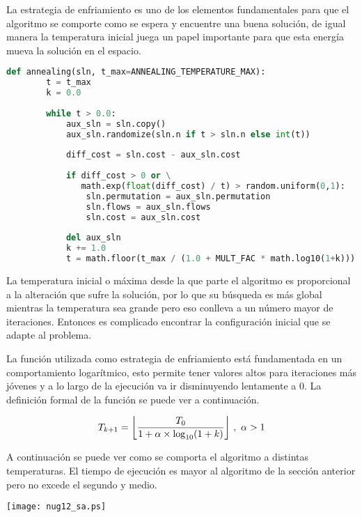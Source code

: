 La estrategia de enfriamiento es uno de los elementos fundamentales para que el algoritmo se comporte como se espera y encuentre una buena solución, de igual manera la temperatura inicial juega un papel importante para que esta energía mueva la solución en el espacio.

\newpage

\begin{lstlisting}[language=Python]
    def annealing(sln, t_max=ANNEALING_TEMPERATURE_MAX):
        t = t_max
        k = 0.0
    
        while t > 0.0:
            aux_sln = sln.copy()
            aux_sln.randomize(sln.n if t > sln.n else int(t))
    
            diff_cost = sln.cost - aux_sln.cost
    
            if diff_cost > 0 or \
               math.exp(float(diff_cost) / t) > random.uniform(0,1):
                sln.permutation = aux_sln.permutation
                sln.flows = aux_sln.flows
                sln.cost = aux_sln.cost
    
            del aux_sln
            k += 1.0
            t = math.floor(t_max / (1.0 + MULT_FAC * math.log10(1+k)))
\end{lstlisting}

La temperatura inicial o máxima desde la que parte el algoritmo es proporcional a la alteración que sufre la solución, por lo que su búsqueda es más global mientras la temperatura sea grande pero eso conlleva a un número mayor de iteraciones. Entonces es complicado encontrar la configuración inicial que se adapte al problema.

La función utilizada como estrategia de enfriamiento está fundamentada en un comportamiento logarítmico\cite{aarts1989simulated}, esto permite tener valores altos para iteraciones más jóvenes y a lo largo de la ejecución va ir disminuyendo lentamente a 0. La definición formal de la función se puede ver a continuación.

\[T_{k+1} = \floor*{ \frac{T_0}{1 + \alpha\times\log_{10} (1 + k) }}\ ,\ \alpha > 1\]

A continuación se puede ver como se comporta el algoritmo a distintas temperaturas. El tiempo de ejecución es mayor al algoritmo de la sección anterior pero no excede el segundo y medio.
 
\begin{center}
    \texttt{[image: nug12\_sa.ps]}
\end{center}


